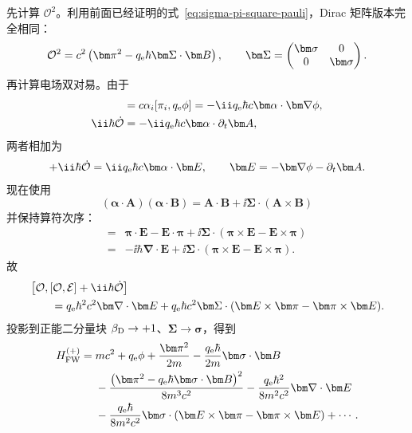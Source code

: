 先计算 $\mathcal O^2$。利用前面已经证明的式~\eqref{eq:sigma-pi-square-pauli}，Dirac 矩阵版本完全相同：
\begin{equation}
\mathcal O^2
=c^2\left(\bm\pi^2-q_{\rm e}\hbar\bm\Sigma\cdot\bm B\right),
\qquad
\bm\Sigma=
\begin{pmatrix}
\bm\sigma&0\\0&\bm\sigma
\end{pmatrix}.
\label{eq:FW-O2}
\end{equation}
再计算电场双对易。由于
\begin{align}
[\mathcal O,\mathcal E]
&=c\alpha_i[\pi_i,q_{\rm e}\phi]
=-\ii q_{\rm e}\hbar c\bm\alpha\cdot\bm\nabla\phi,\\
\ii\hbar\dot{\mathcal O}
&=-\ii q_{\rm e}\hbar c\bm\alpha\cdot\partial_t\bm A,
\end{align}
两者相加为
\begin{equation}
[\mathcal O,\mathcal E]+\ii\hbar\dot{\mathcal O}
=\ii q_{\rm e}\hbar c\bm\alpha\cdot\bm E,
\qquad
\bm E=-\bm\nabla\phi-\partial_t\bm A.
\label{eq:FW-gauge-E}
\end{equation}
现在使用
\begin{equation}
(\bm\alpha\cdot\bm A)(\bm\alpha\cdot\bm B)
=\bm A\cdot\bm B
+\ii\bm\Sigma\cdot(\bm A\times\bm B)
\end{equation}
并保持算符次序：
\begin{align}
[\bm\alpha\cdot\bm\pi,\bm\alpha\cdot\bm E]
={}&\bm\pi\cdot\bm E-\bm E\cdot\bm\pi
+\ii\bm\Sigma\cdot
(\bm\pi\times\bm E-\bm E\times\bm\pi)\\
={}&-\ii\hbar\bm\nabla\cdot\bm E
+\ii\bm\Sigma\cdot
(\bm\pi\times\bm E-\bm E\times\bm\pi).
\end{align}
故
\begin{align}
&\left[
\mathcal O,
[\mathcal O,\mathcal E]+\ii\hbar\dot{\mathcal O}
\right]
\nonumber\\
&\qquad=
q_{\rm e}\hbar^2c^2\bm\nabla\cdot\bm E
+q_{\rm e}\hbar c^2\bm\Sigma\cdot
(\bm E\times\bm\pi-\bm\pi\times\bm E).
\label{eq:FW-double-commutator}
\end{align}
投影到正能二分量块 $\beta_{\rm D}\to+1$、$\bm\Sigma\to\bm\sigma$，得到
\begin{align}
H_{\rm FW}^{(+)}
={}&mc^2+q_{\rm e}\phi
+\frac{\bm\pi^2}{2m}
-\frac{q_{\rm e}\hbar}{2m}\bm\sigma\cdot\bm B
\nonumber\\
&-\frac{\left(\bm\pi^2-q_{\rm e}\hbar\bm\sigma\cdot\bm B\right)^2}
{8m^3c^2}
-\frac{q_{\rm e}\hbar^2}{8m^2c^2}\bm\nabla\cdot\bm E
\nonumber\\
&-\frac{q_{\rm e}\hbar}{8m^2c^2}
\bm\sigma\cdot
(\bm E\times\bm\pi-\bm\pi\times\bm E)
+\cdots .
\label{eq:FW-positive-general}
\end{align}
